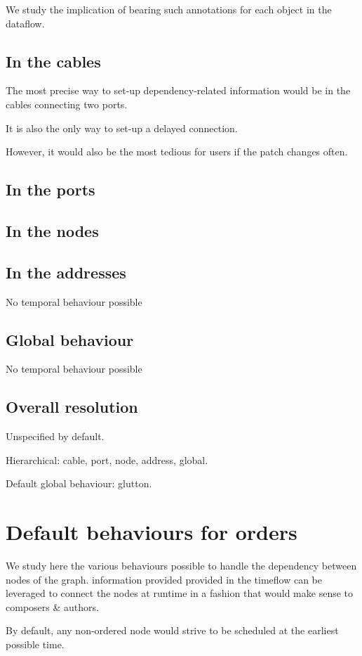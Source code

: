 \documentclass{article}
\begin{document}
We study the implication of bearing such annotations for each object in the dataflow.

\subsection{In the cables}
The most precise way to set-up dependency-related information would be in 
the cables connecting two ports. 
    
It is also the only way to set-up a delayed connection.
    
However, it would also be the most tedious for users if the patch changes often.
    
\subsection{In the ports}
\subsection{In the nodes}
\subsection{In the addresses}
No temporal behaviour possible
\subsection{Global behaviour}
No temporal behaviour possible
\subsection{Overall resolution}
Unspecified by default. 
    
Hierarchical: cable, port, node, address, global.
    
Default global behaviour: glutton.
    
  
\section{Default behaviours for orders}
\label{sec.order}
We study here the various behaviours possible to handle the dependency between nodes of the graph.
information provided provided in the timeflow can be leveraged to connect the nodes at runtime in a fashion 
that would make sense to composers \& authors.
    
By default, any non-ordered node would strive to be scheduled at the earliest possible time.
    
\end{document}
